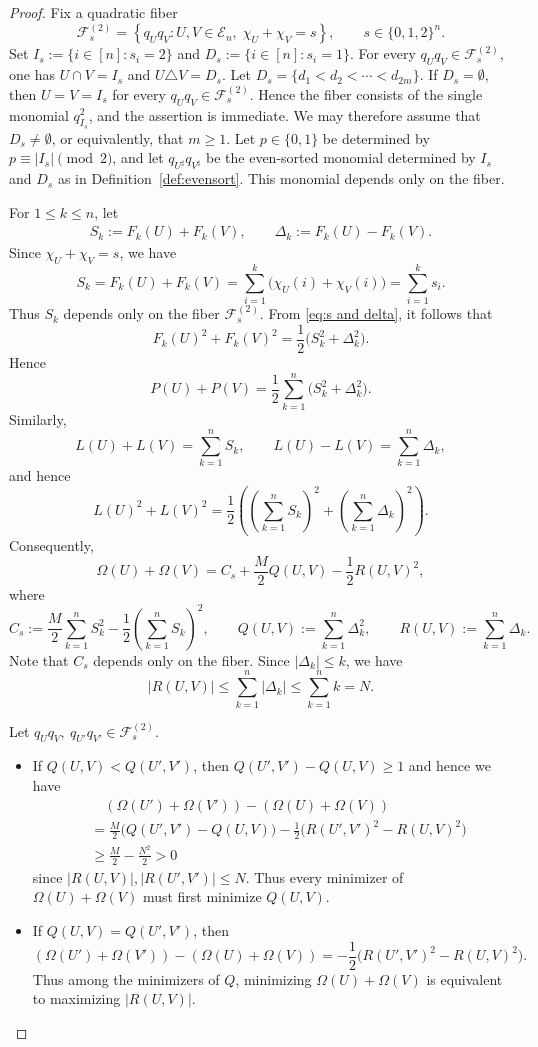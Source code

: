 \documentclass[10pt,a4paper]{amsart}
\begin{document}
\begin{proof}
Fix a quadratic fiber
\[
 \mathcal{F}^{(2)}_s
=
 \left\{
q_Uq_V : U,V\in\mathcal{E}_n,\;
 \chi_U+\chi_V=s
 \right\},
 \qquad s\in\{0,1,2\}^n.
\]
Set $I_s:=\{i\in[n]:s_i=2\}$ and $D_s:=\{i\in[n]:s_i=1\}$. For every $q_Uq_V\in\mathcal{F}^{(2)}_s$, one has $U\cap V=I_s$ and $U\triangle V=D_s$. 
Let $D_s=\{d_1<d_2<\cdots<d_{2m}\}$.
If $D_s=\emptyset$, then $U=V=I_s$ for every $q_Uq_V\in\mathcal F_s^{(2)}$. Hence the fiber consists of the single monomial $q_{I_s}^2$, and the assertion is immediate. We may therefore assume that $D_s\ne\emptyset$, or equivalently, that $m\ge 1$.
Let $p\in\{0,1\}$ be determined by $p\equiv |I_s|\pmod 2$, and let $q_{U^\sharp}q_{V^\sharp}$ be the even-sorted monomial determined by $I_s$ and $D_s$ as in Definition~\ref{def:evensort}. 
This monomial depends only on the fiber.


For $1\le k\le n$, let
\begin{align}   \label{eq:s and delta}
S_k:=F_k(U)+F_k(V),
\qquad
\Delta_k:=F_k(U)-F_k(V).
\end{align}
Since $\chi_U+\chi_V=s$, we have
\[
S_k
=
F_k(U)+F_k(V)
=
\sum_{i=1}^k\bigl(\chi_U(i)+\chi_V(i)\bigr)
=
\sum_{i=1}^k s_i.
\]
Thus $S_k$ depends only on the fiber
$\mathcal F_s^{(2)}$.
From \eqref{eq:s and delta},
it follows that
\[
F_k(U)^2+F_k(V)^2
=
\frac12\bigl(S_k^2+\Delta_k^2\bigr).
\]
Hence
\[
P(U)+P(V)
=
\frac12\sum_{k=1}^n
\bigl(S_k^2+\Delta_k^2\bigr).
\]
Similarly,
\[
L(U)+L(V)
=
\sum_{k=1}^n S_k,
\qquad
L(U)-L(V)
=
\sum_{k=1}^n \Delta_k,
\]
and hence
\[
L(U)^2+L(V)^2
=
\frac12\left(
\left(\sum_{k=1}^n S_k\right)^2
+
\left(\sum_{k=1}^n\Delta_k\right)^2
\right).
\]
Consequently,
\[
 \Omega(U)+\Omega(V)
= C_s+\frac{M}{2}Q(U,V)-\frac12R(U,V)^2,
\]
where
\[
 C_s:=\frac M2\sum_{k=1}^nS_k^2
 -\frac12\left(\sum_{k=1}^nS_k\right)^2,
\qquad
Q(U,V):=\sum_{k=1}^n\Delta_k^2,
 \qquad
R(U,V):=\sum_{k=1}^n\Delta_k.
\]
Note that $C_s$ depends only on the fiber.
Since $|\Delta_k|\le k$, we have
\[
 |R(U,V)|\le\sum_{k=1}^n|\Delta_k|
 \le\sum_{k=1}^n k=N.
\]

Let $ q_Uq_V,\ q_{U'}q_{V'}\in\mathcal{F}^{(2)}_s$.
\begin{itemize}
    \item 
If $Q(U,V)<Q(U',V')$, then 
$Q(U',V') - Q(U,V) \ge 1$
and hence
we have
\begin{align*}
& \quad ( \Omega(U')+\Omega(V'))-( \Omega(U)+\Omega(V))\\
& =
 \frac{M}{2}\bigl(Q(U',V')-Q(U,V)\bigr)
-
 \frac12\bigl(R(U',V')^2-R(U,V)^2\bigr)\\
& \ge
 \frac{M}{2}-\frac{N^2}{2}>0
\end{align*}
since $|R(U,V)|, |R(U',V')| \le N$.
Thus every minimizer of \(\Omega(U)+\Omega(V)\) must first minimize
\(Q(U,V)\).
\item
If $Q(U,V)=Q(U',V')$, then 
\[
( \Omega(U')+\Omega(V'))-( \Omega(U)+\Omega(V))
=-
 \frac12\bigl(R(U',V')^2-R(U,V)^2\bigr).
\]
Thus among the minimizers of \(Q\), minimizing
\(\Omega(U)+\Omega(V)\) is equivalent to maximizing
$|R(U,V)|$.
\end{itemize}


\end{proof}
\end{document}
